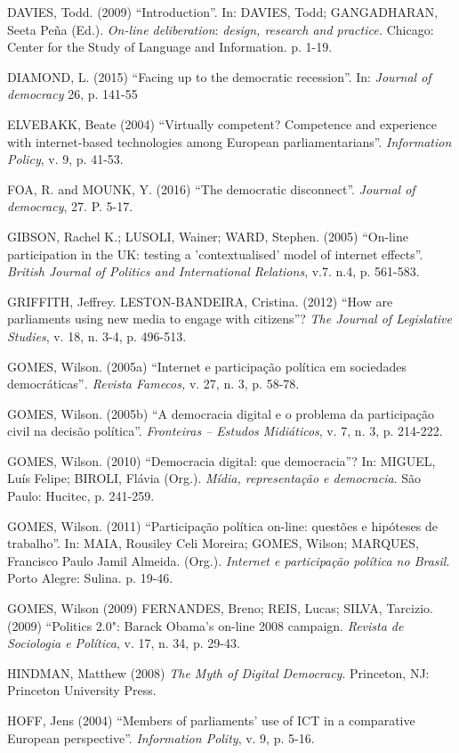 DAVIES, Todd. (2009) ``Introduction''. In: DAVIES, Todd; GANGADHARAN,
Seeta Peña (Ed.). \emph{On-line deliberation}: \emph{design, research
and practice.} Chicago: Center for the Study of Language and
Information. p. 1-19.

DIAMOND, L. (2015) ``Facing up to the democratic recession''. In:
\emph{Journal of democracy} 26, p. 141-55

ELVEBAKK, Beate (2004) ``Virtually competent? Competence and experience
with internet-based technologies among European parliamentarians''.
\emph{Information Policy}, v. 9, p. 41-53.

FOA, R. and MOUNK, Y. (2016) ``The democratic disconnect''.
\emph{Journal of democracy}, 27. P. 5-17.

GIBSON, Rachel K.; LUSOLI, Wainer; WARD, Stephen. (2005) ``On-line
participation in the UK: testing a 'contextualised' model of internet
effects''. \emph{British Journal of Politics and International
Relations}, v.7. n.4, p. 561-583.

GRIFFITH, Jeffrey. LESTON-BANDEIRA, Cristina. (2012) ``How are
parliaments using new media to engage with citizens''? \emph{The Journal
of Legislative Studies}, v. 18, n. 3-4, p. 496-513.

GOMES, Wilson. (2005a) ``Internet e participação política em sociedades
democráticas''\emph{. Revista Famecos,} v. 27, n. 3, p. 58-78.

GOMES, Wilson. (2005b) ``A democracia digital e o problema da
participação civil na decisão política''. \emph{Fronteiras -- Estudos
Midiáticos}, v. 7, n. 3, p. 214-222.

GOMES, Wilson. (2010) ``Democracia digital: que democracia''? In:
MIGUEL, Luís Felipe; BIROLI, Flávia (Org.). \emph{Mídia, representação e
democracia}. São Paulo: Hucitec, p. 241-259.

GOMES, Wilson. (2011) ``Participação política on-line: questões e
hipóteses de trabalho''. In: MAIA, Rousiley Celi Moreira; GOMES, Wilson;
MARQUES, Francisco Paulo Jamil Almeida. (Org.). \emph{Internet e
participação política no Brasil}. Porto Alegre: Sulina. p. 19-46.

GOMES, Wilson (2009) FERNANDES, Breno; REIS, Lucas; SILVA, Tarcizio.
(2009) ``Politics 2.0": Barack Obama's on-line 2008 campaign.
\emph{Revista de Sociologia e Política}, v. 17, n. 34, p. 29-43.

HINDMAN, Matthew (2008) \emph{The Myth of Digital Democracy}. Princeton,
NJ: Princeton University Press.

HOFF, Jens (2004) ``Members of parliaments' use of ICT in a comparative
European perspective''. \emph{Information Polity}, v. 9, p. 5-16.

